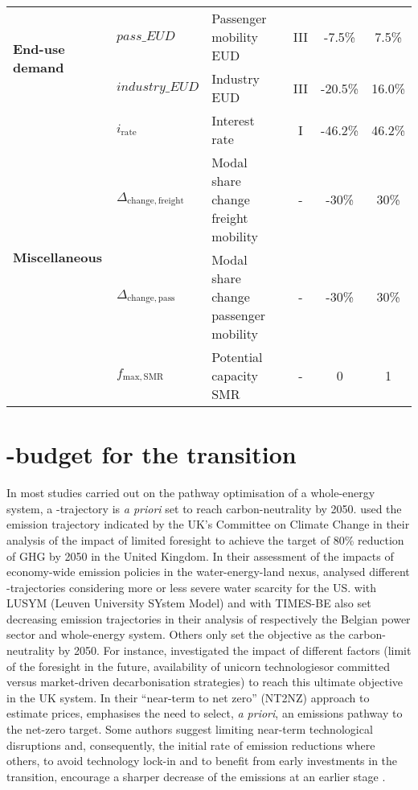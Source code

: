 \begin{table}[htbp!]
\begin{minipage}{\linewidth}
{\begin{tabular}{l l l c c c}
\multirow{2}{*}{\textbf{End-use demand}} & $pass\_EUD$ & Passenger mobility EUD & III & -7.5\% & 7.5\% \\
& $industry\_EUD$ & Industry EUD & III & -20.5\% & 16.0\% \\
\midrule

\multirow{4}{*}{\textbf{Miscellaneous}} &$i_{\mathrm{rate}}$  & Interest rate & I & -46.2\% & 46.2\% \\
& $\Delta_{\mathrm{change,freight}}$ & Modal share change freight mobility & - & -30\% & 30\% \\
& $\Delta_{\mathrm{change,pass}}$ & Modal share change passenger mobility & - & -30\% & 30\% \\
& $f_{\mathrm{max,SMR}}$ & Potential capacity \gls{SMR} & - & 0 & 1 \\

\bottomrule							

\end{tabular}}
\end{minipage}
\end{table}

\section{-budget for the transition}
\label{sec:cs:CO2-budget}
In most studies carried out on the pathway optimisation of a whole-energy system, a -trajectory is \textit{a priori} set to reach carbon-neutrality by 2050. \citet{nerini2017myopic} used the emission trajectory indicated by the UK's Committee on Climate Change in their analysis of the impact of limited foresight to achieve the target of 80\% reduction of \gls{GHG} by 2050 in the United Kingdom. In their assessment of the impacts of economy-wide emission policies in the water-energy-land nexus, \citet{licandeo2023assessing} analysed different -trajectories considering more or less severe water scarcity for the US. \citet{poncelet2016myopic} with LUSYM (Leuven University SYstem Model) and \citet{PATHS2050} with TIMES-BE also set decreasing emission trajectories in their analysis of respectively the Belgian power sector and whole-energy system.  Others only set the objective as the carbon-neutrality by 2050. For instance, \citet{heuberger2018impact} investigated the impact of different factors (\eg limit of the foresight in the future, availability of \og unicorn technologies\fg or committed versus market-driven decarbonisation strategies) to reach this ultimate objective in the UK system. In their ``near-term to net zero'' (NT2NZ) approach to estimate  prices, \citet{kaufman2020near} emphasises the need to select, \textit{a priori}, an emissions pathway to the net-zero target. Some authors suggest limiting near-term technological disruptions and, consequently, the initial rate of emission reductions \cite{wigley1996economic} where others, to avoid technology lock-in and to benefit from early investments in the transition, encourage a sharper decrease of the emissions at an earlier stage \cite{vogt2018starting}.

